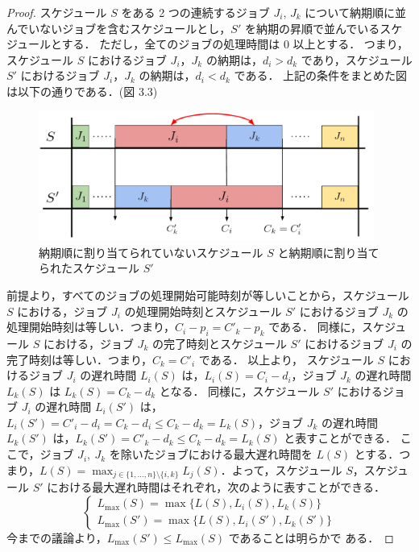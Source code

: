 \documentclass[12pt]{optlab-bachelor}
\begin{document}
\begin{proof}
  スケジュール $S$ をある 2 つの連続するジョブ $J_i$, $J_k$ について納期順に並んでいないジョブを含むスケジュールとし，$S'$ を納期の昇順で並んでいるスケジュールとする．
  ただし，全てのジョブの処理時間は 0 以上とする．
  つまり，スケジュール $S$ におけるジョブ $J_i$，$J_k$ の納期は，$d_i > d_k$ であり，スケジュール $S'$ におけるジョブ $J_i$，$J_k$ の納期は，$d_i < d_k$ である．
  上記の条件をまとめた図は以下の通りである．(図 3.3)

  \begin{figure}[h]
    \centering
    \includegraphics[width = 11cm]{figure/EDDrule.pdf}
    \caption{納期順に割り当てられていないスケジュール $S$ と納期順に割り当てられたスケジュール $S'$}
  \end{figure}

  前提より，すべてのジョブの処理開始可能時刻が等しいことから，スケジュール $S$ における，ジョブ $J_i$ の処理開始時刻とスケジュール $S'$ におけるジョブ $J_k$ の処理開始時刻は等しい．つまり，$C_i - p_i = C'_k - p_k$ である．
  同様に，スケジュール $S$ における，ジョブ $J_k$ の完了時刻とスケジュール $S'$ におけるジョブ $J_i$ の完了時刻は等しい．つまり，$C_k = C'_i$ である．
  以上より，
  スケジュール $S$ におけるジョブ $J_i$ の遅れ時間 $L_i(S)$ は，$L_i(S) = C_i - d_i$，ジョブ $J_k$ の遅れ時間 $L_k(S)$ は $L_k(S) = C_k - d_k$ となる．
  同様に，スケジュール $S'$ におけるジョブ $J_i$ の遅れ時間 $L_i(S')$ は，$L_i(S') = C'_i - d_i = C_k - d_i \le C_k - d_k = L_k(S)$，ジョブ $J_k$ の遅れ時間 $L_k(S')$ は，$L_k(S') = C'_k - d_k \le C_k - d_k = L_k(S)$ と表すことができる．
  ここで，ジョブ $J_i,\ J_k$ を除いたジョブにおける最大遅れ時間を $L(S)$
  とする．つまり，$L(S) = \displaystyle \max_{j \in \{1,\ldots,n\}
  \setminus \{i,k\}}L_j(S)$．よって，スケジュール $S$，スケジュール
  $S'$ における最大遅れ時間はそれぞれ，次のように表すことができる．
  \begin{displaymath}
    \left\{ \begin{array}{lll} L_{\max}(S) =
    \max\bigg\{L(S),L_i(S),L_k(S)\bigg\} \\ L_{\max}(S') =
    \max\bigg\{L(S),L_i(S'),L_k(S')\bigg\}\end{array} \right.
  \end{displaymath}
  今までの議論より，$L_{\max}(S') \le L_{\max}(S)$ であることは明らかで
  ある．


\end{proof}
\end{document}
